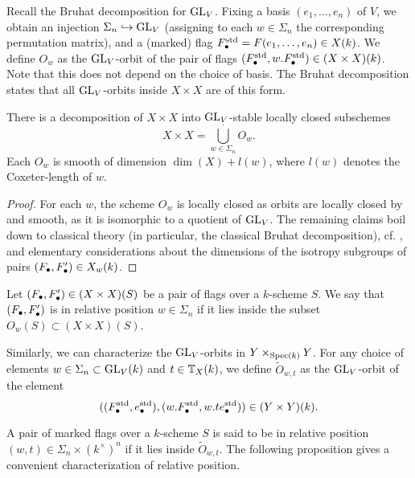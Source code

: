 \documentclass[../main.tex]{subfiles}
\begin{document}
Recall the Bruhat decomposition for $\operatorname{GL}_V$.
Fixing a basis $(e_1, \dots, e_n)$ of $V$, we obtain an injection
$\Sigma_n \hookrightarrow \operatorname{GL}_V$ (assigning to each $w \in \Sigma_n$ the corresponding
permutation matrix), and a (marked) flag $F_\bullet^{\mathrm{std}} = F(e_1, \dots, e_n) \in
X(k)$. We define $O_w$ as the $\operatorname{GL}_V$-orbit
of the pair of flags $(F_\bullet^{\mathrm{std}}, w.F_\bullet^{\mathrm{std}}) \in (X \times X)(k)$.
Note that this does not depend on the choice of basis.
The Bruhat decomposition states that all $\operatorname{GL}_V$-orbits inside $X \times X$ are of 
this form.

\begin{prop}\label{prop:BruhatDecomp}
  There is a decomposition of 
  $X \times X$ into $\operatorname{GL}_V$-stable locally closed subschemes
  \begin{equation*}
    X \times X = \bigcup_{w \in \Sigma_n}^{\cdot} O_w.
  \end{equation*}
  Each $O_w$ is smooth of dimension $\dim(X) + l(w)$, where $l(w)$ denotes the
  Coxeter-length of $w$.
\begin{proof}
   For each $w$, the scheme $O_w$ is locally closed as orbits are locally
   closed by \cite[Proposition 1.65 b)]{milne2017algebraic} and smooth,
   as it is isomorphic to a quotient of $\operatorname{GL}_V$. The remaining claims
   boil down to classical theory (in particular, the classical Bruhat decomposition),
   cf. \cite[Chapter 21]{milne2017algebraic}, and elementary considerations about 
   the dimensions of the isotropy subgroups of pairs $(F_\bullet, F_\bullet') \in X_w(k)$.
\end{proof}
\end{prop}

Let $(F_\bullet, F_\bullet') \in (X \times X)(S)$ be a pair of flags over a $k$-scheme
$S$. We say that $(F_\bullet,F_\bullet')$ is in relative position 
$w \in \Sigma_n$ if it lies inside the subset $O_w(S) \subset (X \times X)(S)$. 

Similarly, we can characterize the $\operatorname{GL}_V$-orbits in $Y \times_{\operatorname{Spec}(k)} Y$.
For any choice of elements $w \in \Sigma_n \subset \operatorname{GL}_V(k)$ and $t \in
\mathbb{T}_X(k)$, we define $\tilde O_{w,t}$ as the $\operatorname{GL}_V$-orbit of the element
$$((F_\bullet^{\mathrm{std}}, e_\bullet^{\mathrm{std}}), (w.F_\bullet^{\mathrm{std}}, w.te_\bullet^{\mathrm{std}})) \in (Y
\times Y)(k).$$ 

A pair of marked flags over a $k$-scheme $S$ is said to be in relative position
$(w,t) \in \Sigma_n \times (k^\times)^n$ if it lies inside $\tilde O_{w,t}$.
The following proposition gives a convenient characterization of relative position.
\end{document}
